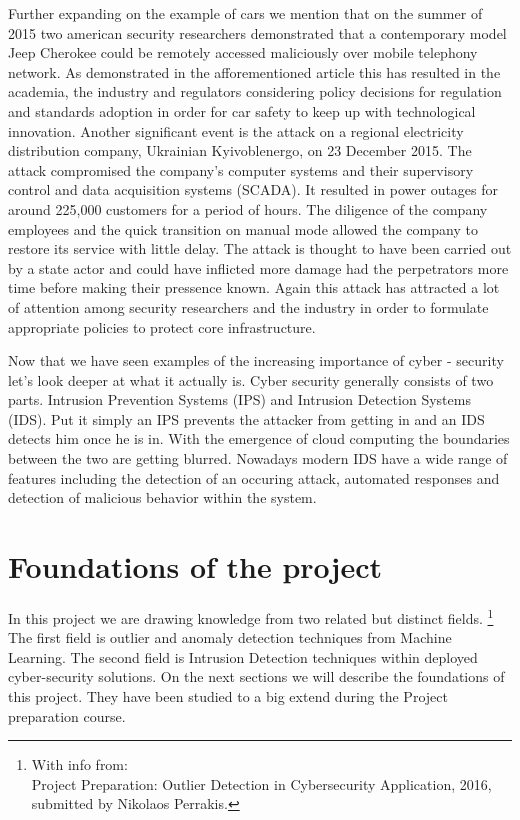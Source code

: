 \documentclass[reqno,openany,12pt]{amsbook}
\begin{document}
Further expanding on the example of cars we mention that on the summer of 2015 two american security researchers demonstrated that a contemporary model Jeep Cherokee could be remotely accessed maliciously over mobile telephony network.\cite{intro-car1} As demonstrated in the afforementioned article\cite{intro-car1} this has resulted in the academia, the industry and regulators considering policy decisions for regulation and standards adoption in order for car safety to keep up with technological innovation. Another significant event is the attack on a regional electricity distribution company, Ukrainian Kyivoblenergo, on 23 December 2015. The attack compromised the company's computer systems and their supervisory control and data acquisition systems (SCADA). It resulted in power outages for around 225,000 customers for a period of hours. The diligence of the company employees and the quick transition on 
manual mode allowed the company to restore its service with little delay. The attack is thought to have been carried out by a state actor and could have inflicted more damage had the perpetrators more time before making their pressence known. Again this attack has attracted a lot of attention among security researchers and the industry in order to formulate appropriate policies to protect core infrastructure\cite{intro-cps1}.

Now that we have seen examples of the increasing importance of cyber - security let's look deeper at what it actually is. Cyber security generally consists of two parts. Intrusion Prevention Systems (IPS) and Intrusion Detection Systems (IDS). Put it simply an IPS prevents the attacker from getting in and an IDS detects him once he is in. With the emergence of cloud computing the boundaries between the two are getting blurred\cite{intro-ids1}. Nowadays modern IDS have a wide range of features including the detection of an occuring attack, automated responses and detection of malicious behavior within the system\cite{intro-ids1}.


\chapter{Foundations of the project}

In this project we are drawing knowledge from two related but distinct fields.
\footnote{With info from:\\
Project Preparation: Outlier Detection in Cybersecurity Application, 2016, submitted by Nikolaos Perrakis.}
The first field is outlier and anomaly detection techniques from Machine Learning. The second field is Intrusion Detection techniques within deployed cyber-security solutions. On the next sections we will describe the foundations of this project. They have been studied to a big extend during the Project preparation course.
\end{document}
